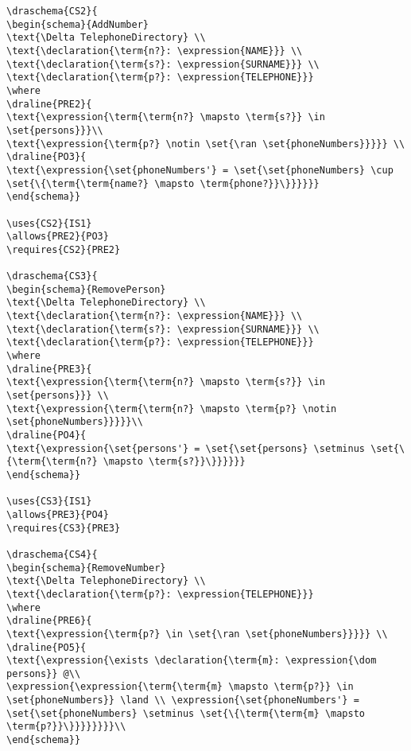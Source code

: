 \begin{verbatim}
\draschema{CS2}{
\begin{schema}{AddNumber}
\text{\Delta TelephoneDirectory} \\
\text{\declaration{\term{n?}: \expression{NAME}}} \\
\text{\declaration{\term{s?}: \expression{SURNAME}}} \\
\text{\declaration{\term{p?}: \expression{TELEPHONE}}}
\where
\draline{PRE2}{
\text{\expression{\term{\term{n?} \mapsto \term{s?}} \in \set{persons}}}\\
\text{\expression{\term{p?} \notin \set{\ran \set{phoneNumbers}}}}} \\
\draline{PO3}{
\text{\expression{\set{phoneNumbers'} = \set{\set{phoneNumbers} \cup \set{\{\term{\term{name?} \mapsto \term{phone?}}\}}}}}}
\end{schema}}

\uses{CS2}{IS1}
\allows{PRE2}{PO3}
\requires{CS2}{PRE2}

\draschema{CS3}{
\begin{schema}{RemovePerson}
\text{\Delta TelephoneDirectory} \\
\text{\declaration{\term{n?}: \expression{NAME}}} \\
\text{\declaration{\term{s?}: \expression{SURNAME}}} \\
\text{\declaration{\term{p?}: \expression{TELEPHONE}}}
\where
\draline{PRE3}{
\text{\expression{\term{\term{n?} \mapsto \term{s?}} \in \set{persons}}} \\
\text{\expression{\term{\term{n?} \mapsto \term{p?} \notin \set{phoneNumbers}}}}}\\
\draline{PO4}{
\text{\expression{\set{persons'} = \set{\set{persons} \setminus \set{\{\term{\term{n?} \mapsto \term{s?}}\}}}}}}
\end{schema}}

\uses{CS3}{IS1}
\allows{PRE3}{PO4}
\requires{CS3}{PRE3}

\draschema{CS4}{
\begin{schema}{RemoveNumber}
\text{\Delta TelephoneDirectory} \\
\text{\declaration{\term{p?}: \expression{TELEPHONE}}}
\where
\draline{PRE6}{
\text{\expression{\term{p?} \in \set{\ran \set{phoneNumbers}}}}} \\
\draline{PO5}{
\text{\expression{\exists \declaration{\term{m}: \expression{\dom persons}} @\\
\expression{\expression{\term{\term{m} \mapsto \term{p?}} \in \set{phoneNumbers}} \land \\ \expression{\set{phoneNumbers'} = \set{\set{phoneNumbers} \setminus \set{\{\term{\term{m} \mapsto \term{p?}}\}}}}}}}}\\
\end{schema}}


\end{verbatim}
